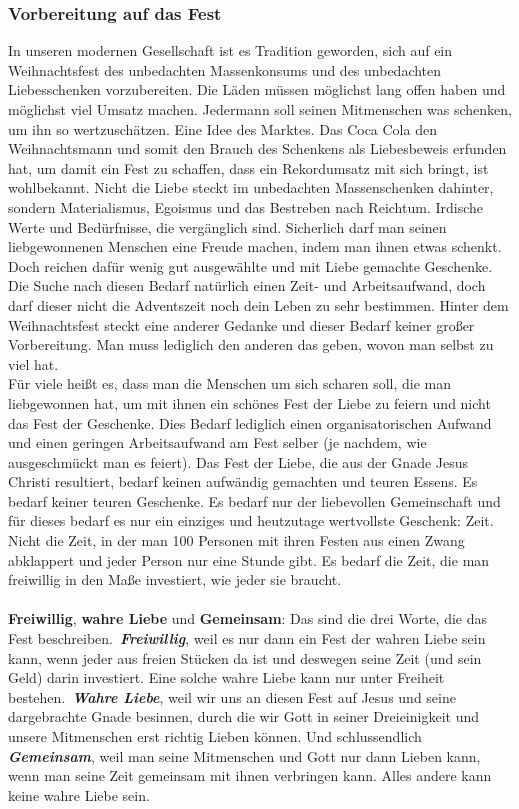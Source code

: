 \subsubsection*{Vorbereitung auf das Fest}
In unseren modernen Gesellschaft ist es Tradition geworden, sich auf ein Weihnachtsfest des unbedachten Massenkonsums und des unbedachten Liebesschenken vorzubereiten. Die Läden müssen möglichst lang offen haben und möglichst viel Umsatz machen. Jedermann soll seinen Mitmenschen was schenken, um ihn so wertzuschätzen. Eine Idee des Marktes. Das Coca Cola den Weihnachtsmann und somit den Brauch des Schenkens als Liebesbeweis erfunden hat, um damit ein Fest zu schaffen, dass ein Rekordumsatz mit sich bringt, ist wohlbekannt. Nicht die Liebe steckt im unbedachten Massenschenken dahinter, sondern Materialismus, Egoismus und das Bestreben nach Reichtum. Irdische Werte und Bedürfnisse, die vergänglich sind. Sicherlich darf man seinen liebgewonnenen Menschen eine Freude machen, indem man ihnen etwas schenkt. Doch reichen dafür wenig gut ausgewählte und mit Liebe gemachte Geschenke. Die Suche nach diesen Bedarf natürlich einen Zeit- und Arbeitsaufwand, doch darf dieser nicht die Adventszeit noch dein Leben zu sehr bestimmen. Hinter dem Weihnachtsfest steckt eine anderer Gedanke und dieser Bedarf keiner großer Vorbereitung. Man muss lediglich den anderen das geben, wovon man selbst zu viel hat.
\\
Für viele heißt es, dass man die Menschen um sich scharen soll, die man liebgewonnen hat, um mit ihnen ein schönes Fest der Liebe zu feiern und nicht das Fest der Geschenke. Dies Bedarf lediglich einen organisatorischen Aufwand und einen geringen Arbeitsaufwand am Fest selber (je nachdem, wie ausgeschmückt man es feiert). Das Fest der Liebe, die aus der Gnade Jesus Christi resultiert, bedarf keinen aufwändig gemachten und teuren Essens. Es bedarf keiner teuren Geschenke. Es bedarf nur der liebevollen Gemeinschaft und für dieses bedarf es nur ein einziges und heutzutage wertvollste Geschenk: Zeit. Nicht die Zeit, in der man 100 Personen mit ihren Festen aus einen Zwang abklappert und jeder Person nur eine Stunde gibt. Es bedarf die Zeit, die man freiwillig in den Maße investiert, wie jeder sie braucht. 
\\~\\
\textbf{Freiwillig}, \textbf{wahre Liebe} und \textbf{Gemeinsam}: Das sind die drei Worte, die das Fest beschreiben.\ \textbf{\textit{Freiwillig}}, weil es nur dann ein Fest der wahren Liebe sein kann, wenn jeder aus freien Stücken da ist und deswegen seine Zeit (und sein Geld) darin investiert. Eine solche wahre Liebe kann nur unter Freiheit bestehen.\ \textbf{\textit{Wahre Liebe}}, weil wir uns an diesen Fest auf Jesus und seine dargebrachte Gnade besinnen, durch die wir Gott in seiner Dreieinigkeit und unsere Mitmenschen erst richtig Lieben können. Und schlussendlich \textbf{\textit{Gemeinsam}}, weil man seine Mitmenschen und Gott nur dann Lieben kann, wenn man seine Zeit gemeinsam mit ihnen verbringen kann. Alles andere kann keine wahre Liebe sein.
